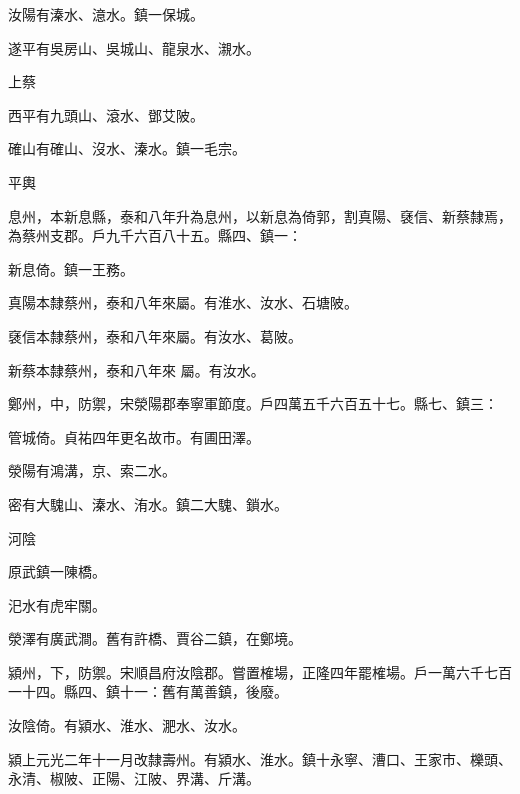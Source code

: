 \begin{pinyinscope}
 汝陽有溱水、澺水。鎮一保城。



 遂平有吳房山、吳城山、龍泉水、瀙水。



 上蔡



 西平有九頭山、滾水、鄧艾陂。



 確山有確山、沒水、溱水。鎮一毛宗。



 平輿



 息州，本新息縣，泰和八年升為息州，以新息為倚郭，割真陽、褎信、新蔡隸焉，為蔡州支郡。戶九千六百八十五。縣四、鎮一：



 新息倚。鎮一王務。



 真陽本隸蔡州，泰和八年來屬。有淮水、汝水、石塘陂。



 褎信本隸蔡州，泰和八年來屬。有汝水、葛陂。



 新蔡本隸蔡州，泰和八年來
 屬。有汝水。



 鄭州，中，防禦，宋滎陽郡奉寧軍節度。戶四萬五千六百五十七。縣七、鎮三：



 管城倚。貞祐四年更名故市。有圃田澤。



 滎陽有鴻溝，京、索二水。



 密有大騩山、溱水、洧水。鎮二大騩、鎖水。



 河陰



 原武鎮一陳橋。



 汜水有虎牢關。



 滎澤有廣武澗。舊有許橋、賈谷二鎮，在鄭境。



 潁州，下，防禦。宋順昌府汝陰郡。嘗置榷場，正隆四年罷榷場。戶一萬六千七百一十四。縣四、鎮十一：舊有萬善鎮，後廢。



 汝陰倚。有潁水、淮水、淝水、汝水。



 潁上元光二年十一月改隸壽州。有潁水、淮水。鎮十永寧、漕口、王家市、櫟頭、永清、椒陂、正陽、江陂、界溝、斤溝。




\end{pinyinscope}
